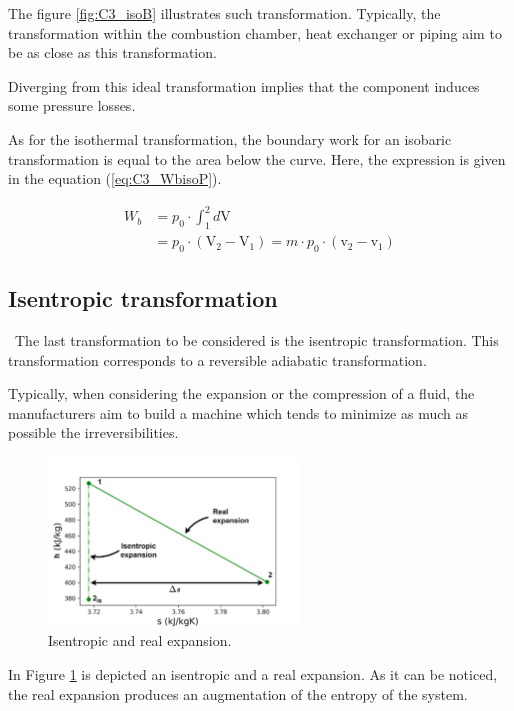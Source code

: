 The figure \ref{fig:C3_isoB} illustrates such transformation.
Typically, the transformation within the combustion chamber, heat exchanger or piping aim to be as close as this transformation. 

Diverging from this ideal transformation implies that the component induces some pressure losses.

As for the isothermal transformation, the boundary work for an isobaric transformation is equal to the area below the curve. Here, the expression is given in the equation (\ref{eq:C3_WbisoP}).

\begin{align}
  W_b &= p_0\cdot \int_1^2d\mathrm{V}\nonumber\\
   &= p_0\cdot (\mathrm{V_2} - \mathrm{V_1}) = m\cdot p_0\cdot (\mathrm{v_2} - \mathrm{v_1}) \label{eq:C3_WbisoP}
\end{align}

\subsection{Isentropic transformation}
\quad\ The last transformation to be considered is the isentropic transformation. This transformation corresponds to a reversible adiabatic transformation. 

Typically, when considering the expansion or the compression of a fluid, the manufacturers aim to build a machine which tends to minimize as much as possible the irreversibilities. 

\begin{figure}[h]
  \centering
  \includegraphics[width=0.6\textwidth]{expansion.png}
  \caption{Isentropic and real expansion.}
  \label{fig:C3_expansion}
\end{figure}
In Figure \ref{fig:C3_expansion} is depicted an isentropic and a real expansion. As it can be noticed, the real expansion produces an augmentation of the entropy of the system. 

